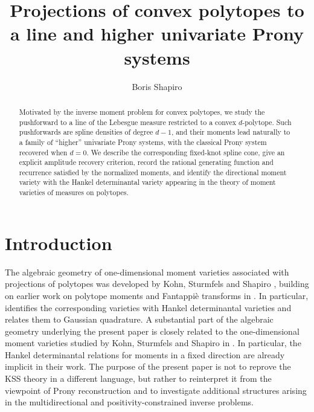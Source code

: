 \documentclass[reqno]{amsart}
\numberwithin{theorem}{section}
\begin{document}
\date{}

\title[Projections of polytopes and higher Prony systems]{\textbf{Projections of convex polytopes to a line and higher univariate Prony systems}}



\author{Boris Shapiro}
\address{Matematiska institutionen, Stockholms universitet, S-106 91 Stockholm, Sweden}

\begin{abstract}


Motivated by the inverse moment problem for convex polytopes, we study the pushforward to a line of the Lebesgue measure restricted to a convex $d$-polytope. Such pushforwards are spline densities of degree $d-1$, and their moments lead naturally to a family of ``higher'' univariate Prony systems, with the classical Prony system recovered when $d=0$. We describe the corresponding fixed-knot spline cone, give an explicit amplitude recovery criterion, record the rational generating function and recurrence satisfied by the normalized moments, and identify the directional moment variety with the Hankel determinantal variety appearing in the theory of moment varieties of measures on polytopes.
\end{abstract}





\maketitle

\section{Introduction}

\medskip

\noindent
The algebraic geometry of one-dimensional moment varieties associated with
projections of polytopes was developed by Kohn, Sturmfels and Shapiro
\cite{KSS}, building on earlier work on polytope moments and Fantappi\`e
transforms in \cite{GPSS,GLPR}.  In particular, \cite{KSS} identifies the
corresponding varieties with Hankel determinantal varieties and relates
them to Gaussian quadrature.  A substantial part of the algebraic geometry underlying the present paper
is closely related to the one-dimensional moment varieties studied by
Kohn, Sturmfels and Shapiro in \cite{KSS}.  In particular, the Hankel
determinantal relations for moments in a fixed direction are already
implicit in their work.  The purpose of the present paper is not to
reprove the KSS theory in a different language, but rather to reinterpret
it from the viewpoint of Prony reconstruction and to investigate additional
structures arising in the multidirectional and positivity-constrained
inverse problems.
\end{document}
